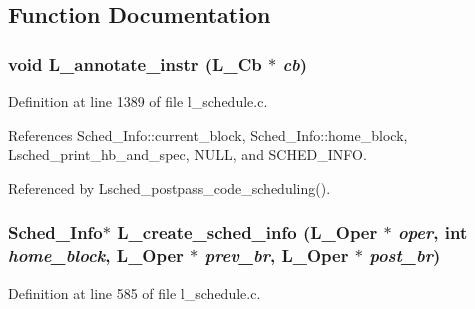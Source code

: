 \subsection{Function Documentation}
\subsubsection{\setlength{\rightskip}{0pt plus 5cm}void L\_\-annotate\_\-instr (L\_\-Cb $\ast$ {\em cb})}\label{l__schedule_8c_e1d1f2e8c81606a280a520d8feb5d7f8}




Definition at line 1389 of file l\_\-schedule.c.

References Sched\_\-Info::current\_\-block, Sched\_\-Info::home\_\-block, Lsched\_\-print\_\-hb\_\-and\_\-spec, NULL, and SCHED\_\-INFO.

Referenced by Lsched\_\-postpass\_\-code\_\-scheduling().
\subsubsection{\setlength{\rightskip}{0pt plus 5cm}\bf{Sched\_\-Info}$\ast$ L\_\-create\_\-sched\_\-info (L\_\-Oper $\ast$ {\em oper}, int {\em home\_\-block}, L\_\-Oper $\ast$ {\em prev\_\-br}, L\_\-Oper $\ast$ {\em post\_\-br})}\label{l__schedule_8c_268dd685af46604df42953774a82cca3}




Definition at line 585 of file l\_\-schedule.c.

